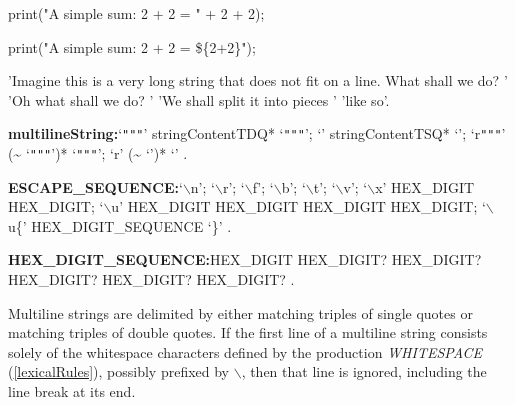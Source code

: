 \documentclass{article}
\begin{document}
\begin{dartCode}
print("A simple sum: 2 + 2 = " +
            2 + 2);
\end{dartCode}


\begin{dartCode}
print("A simple sum: 2 + 2 = \$\{2+2\}");
\end{dartCode}


\begin{dartCode}
'Imagine this is a very long string that does not fit on a line. What shall we do? '
'Oh what shall we do? '
'We shall split it into pieces '
'like so'.
\end{dartCode}

\begin{grammar}
{\bf multilineString:}`{\escapegrammar \texttt{"""}}' stringContentTDQ* `{\escapegrammar \texttt{"""}}';
  `{\escapegrammar {}}' stringContentTSQ* `{\escapegrammar {}}';
  `r{\escapegrammar \texttt{"""}}' (\~{} `{\escapegrammar \texttt{"""}}')* `{\escapegrammar \texttt{"""}}';
  `r{\escapegrammar {}}' (\~{} `{\escapegrammar {}}')* `{\escapegrammar {}}'
  .

{\bf ESCAPE\_SEQUENCE:}`$\backslash$n';
  `$\backslash$r';
  `$\backslash$f';
  `$\backslash$b';
  `$\backslash$t';
  `$\backslash$v';
  `$\backslash$x' HEX\_DIGIT HEX\_DIGIT;
  `$\backslash$u' HEX\_DIGIT HEX\_DIGIT HEX\_DIGIT HEX\_DIGIT;
  `$\backslash$u\{' HEX\_DIGIT\_SEQUENCE `\}'
  .

{\bf HEX\_DIGIT\_SEQUENCE:}HEX\_DIGIT HEX\_DIGIT? HEX\_DIGIT?
  \gnewline{} HEX\_DIGIT? HEX\_DIGIT? HEX\_DIGIT?
  .
\end{grammar}

\LMHash{}
Multiline strings are delimited by either matching triples of single quotes or matching triples of double quotes.
If the first line of a multiline string consists solely of the whitespace characters defined by the production {\em WHITESPACE} (\ref{lexicalRules}), possibly prefixed by $\backslash$, then that line is ignored, including the line break at its end.
\end{document}
